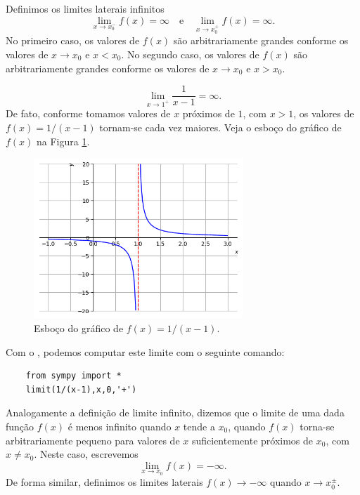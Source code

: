 Definimos os limites laterais infinitos
\begin{equation}
  \lim_{x\to x_0^-} f(x) = \infty\quad\text{e}\quad\lim_{x\to x_0^+} f(x) = \infty.
\end{equation}
No primeiro caso, os valores de $f(x)$ são arbitrariamente grandes conforme os valores de $x\to x_0$ e $x<x_0$. No segundo caso, os valores de $f(x)$ são arbitrariamente grandes conforme os valores de $x\to x_0$ e $x>x_0$.

\begin{ex}
  \begin{equation}
    \lim_{x\to 1^+} \frac{1}{x-1} = \infty.
  \end{equation}
  De fato, conforme tomamos valores de $x$ próximos de $1$, com $x>1$, os valores de $f(x) = 1/(x-1)$ tornam-se cada vez maiores. Veja o esboço do gráfico de $f(x)$ na Figura \ref{fig:ex_liminf_1x}.

\begin{figure}[H]
  \centering
  \includegraphics[width=0.7\textwidth]{./cap_lim/dados/fig_ex_liminf_1x/fig_ex_liminf_1x}
  \caption{Esboço do gráfico de $f(x)=1/(x-1)$.}
  \label{fig:ex_liminf_1x}
\end{figure}  

\ifispython
  Com o {\sympy}, podemos computar este limite com o seguinte comando:
  \begin{lstlisting}
    from sympy import *
    limit(1/(x-1),x,0,'+')
  \end{lstlisting}
\fi
\end{ex}


Analogamente a definição de limite infinito, dizemos que o limite de uma dada função $f(x)$ é menos infinito quando $x$ tende a $x_0$, quando $f(x)$ torna-se arbitrariamente pequeno para valores de $x$ suficientemente próximos de $x_0$, com $x\neq x_0$. Neste caso, escrevemos
\begin{equation}
  \lim_{x\to x_0} f(x) = -\infty.
\end{equation}
De forma similar, definimos os limites laterais $f(x)\to -\infty$ quando $x\to x_0^{\pm}$.

